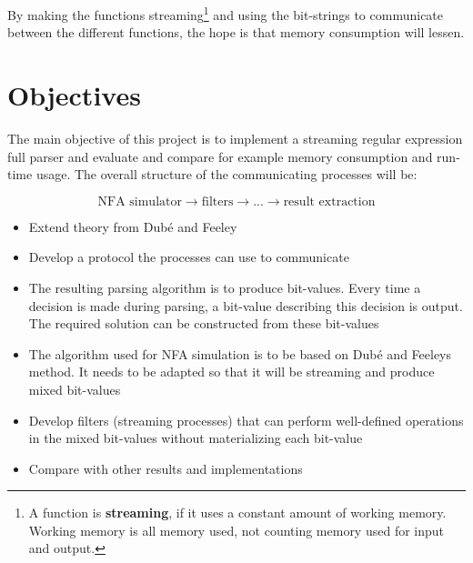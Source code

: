 \documentclass[10pt, a4paper]{article}
\begin{document}

By making the functions streaming\footnote{A function is
  \textbf{streaming}, if it uses a constant amount of working memory.
  Working memory is all memory used, not counting memory used for
  input and output.}  and using the bit-strings to communicate between
the different functions, the hope is that memory consumption will
lessen.







\section*{Objectives}
The main objective of this project is to implement a streaming regular
expression full parser and evaluate and compare for example memory
consumption and run-time usage. The overall structure of the
communicating processes will be:

\begin{equation*}
  \text{NFA simulator}\rightarrow\text{filters}\rightarrow ... \rightarrow
  \text{result extraction}
\end{equation*}



\begin{itemize}
\item Extend theory from Dub\'{e} and Feeley 
\item Develop a protocol the processes can use to communicate
\item The resulting parsing algorithm is to produce bit-values. Every
  time a decision is made during parsing, a bit-value describing this
  decision is output. The required solution can be constructed from
  these bit-values
\item The algorithm used for NFA simulation is to be based on Dub\'{e} and
  Feeleys method. It needs to be adapted so that it will be streaming
  and produce mixed bit-values
\item Develop filters (streaming processes) that can perform
  well-defined operations in the mixed bit-values without
  materializing each bit-value
\item Compare with other results and implementations
\end{itemize}
\end{document}
